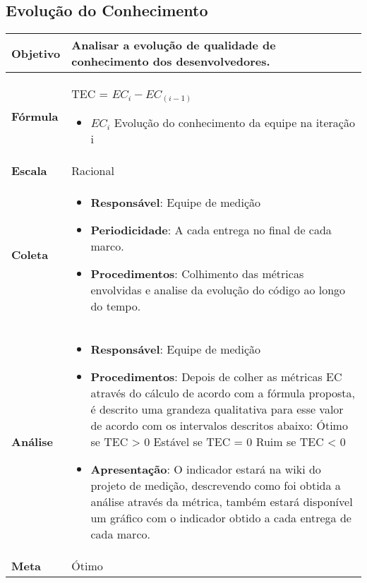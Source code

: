 \subsection{Evolução do Conhecimento}

	\begin{tabular}{ |p{3cm}|p{12cm}| }      
	 \hline
    \textbf{Objetivo} & Analisar a evolução de qualidade de conhecimento dos desenvolvedores. \\
   \hline
    \textbf{Fórmula} & TEC = $EC_i - EC_(i-1)$ \begin{itemize}
			\item $EC_i$ Evolução do conhecimento da equipe na iteração i
		\end{itemize}\\
   \hline
    \textbf{Escala} & Racional \\
   \hline
    \textbf{Coleta} & \begin{itemize}
		 \item \textbf{Responsável}: Equipe de medição
     \item \textbf{Periodicidade}: A cada entrega no final de cada marco.
     \item \textbf{Procedimentos}: Colhimento das métricas envolvidas e analise da evolução do código ao longo do tempo.
    \end{itemize} \\
   \hline
    \textbf{Análise} & \begin{itemize} \item \textbf{Responsável}: Equipe de medição
    \item \textbf{Procedimentos}: Depois de colher as métricas EC através do cálculo de acordo com a fórmula proposta, é descrito uma grandeza qualitativa para esse valor de acordo com os intervalos descritos abaixo:
		 \subitem Ótimo se TEC > 0
		 \subitem Estável se TEC = 0
		 \subitem Ruim se TEC < 0
	\item \textbf{Apresentação}: O indicador estará na wiki do projeto de medição, descrevendo como foi obtida a análise através da métrica, também estará disponível um gráfico com o indicador obtido a cada entrega de cada marco.
	\end{itemize} \\
  \hline
	 \textbf{Meta} & Ótimo \\
	\hline

\end{tabular}
	